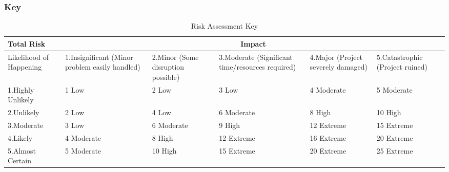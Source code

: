 \documentclass[12pt]{article}
\begin{document}
			
			
			\subsubsection{Key}
				\begin{table}[!htb]
					\begin{center}
						\caption{Risk Assessment Key}
						\label{table:riskassessmentkey}
						\setlength{\aboverulesep}{0pt}
						\setlength{\belowrulesep}{0pt}
						\setlength{\extrarowheight}{.75ex}
						\begin{tabular}{|*{6}{p{2cm}|}}
							\toprule
							Total Risk & \multicolumn{5}{c|}{Impact} \\
							\midrule
							
							Likelihood of Happening & \cellcolor{greenI}1.Insignificant {\scriptsize (Minor problem easily handled)} & \cellcolor{greenII}2.Minor {\scriptsize (Some disruption possible)} & \cellcolor{yellowI}3.Moderate {\scriptsize (Significant time/resources required)} & \cellcolor{orangeI}4.Major {\scriptsize (Project severely damaged)} & \cellcolor{redI}5.Catastrophic {\scriptsize (Project ruined)}\\
							\midrule
							
							\cellcolor{greenI}1.Highly Unlikely & \cellcolor{greenIII}1 Low & \cellcolor{greenIII}2 Low & \cellcolor{greenIII}3 Low & \cellcolor{yellowII}4 Moderate & \cellcolor{yellowII}5 Moderate\\
							\midrule
							
							\cellcolor{greenII} 2.Unlikely & \cellcolor{greenIII}2 Low & \cellcolor{yellowII}4 Low & \cellcolor{yellowII}6 Moderate & \cellcolor{orangeII} 8 High & \cellcolor{orangeII}10 High\\
							\midrule
							
							\cellcolor{yellowI}3.Moderate & \cellcolor{greenIII}3 Low & \cellcolor{yellowII}6 Moderate & \cellcolor{orangeII}9 High & \cellcolor{redII}12 Extreme & \cellcolor{redII}15 Extreme\\
							\midrule
							
							\cellcolor{orangeI}4.Likely & \cellcolor{yellowII}4 Moderate & \cellcolor{orangeII}8 High & \cellcolor{redII}12 Extreme & \cellcolor{redII}16 Extreme & \cellcolor{redII}20 Extreme\\
							\midrule
							
							\cellcolor{redI}5.Almost Certain & \cellcolor{yellowII}5 Moderate & \cellcolor{orangeII}10 High & \cellcolor{redII}15 Extreme & \cellcolor{redII}20 Extreme & \cellcolor{redII}25 Extreme\\
							\bottomrule
						\end{tabular}
					\end{center}
				\end{table}
			    	
\end{document}
